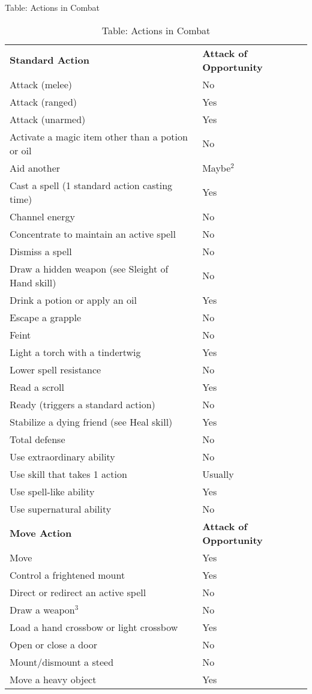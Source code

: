 Table: Actions in Combat
\begin{table}[]
\sffamily
\caption{Table: Actions in Combat}
\begin{tabular}{ll}
\textbf{Standard Action} & \textbf{Attack of Opportunity}\\
Attack (melee) & No\\
Attack (ranged) & Yes\\
Attack (unarmed) & Yes\\
Activate a magic item other than a potion or oil & No\\
Aid another & Maybe\(^{2}\)\\
Cast a spell (1 standard action casting time) & Yes\\
Channel energy & No\\
Concentrate to maintain an active spell & No\\
Dismiss a spell & No\\
Draw a hidden weapon (see Sleight of Hand skill) & No\\
Drink a potion or apply an oil & Yes\\
Escape a grapple & No\\
Feint & No\\
Light a torch with a tindertwig & Yes\\
Lower spell resistance & No\\
Read a scroll & Yes\\
Ready (triggers a standard action) & No\\
Stabilize a dying friend (see Heal skill) & Yes\\
Total defense & No\\
Use extraordinary ability & No\\
Use skill that takes 1 action & Usually\\
Use spell-like ability & Yes\\
Use supernatural ability & No\\
\textbf{Move Action} & \textbf{Attack of Opportunity}\\
Move & Yes\\
Control a frightened mount & Yes\\
Direct or redirect an active spell & No\\
Draw a weapon\(^{3}\) & No\\
Load a hand crossbow or light crossbow & Yes\\
Open or close a door & No\\
Mount/dismount a steed & No\\
Move a heavy object & Yes\\

\end{tabular}
\end{table}
